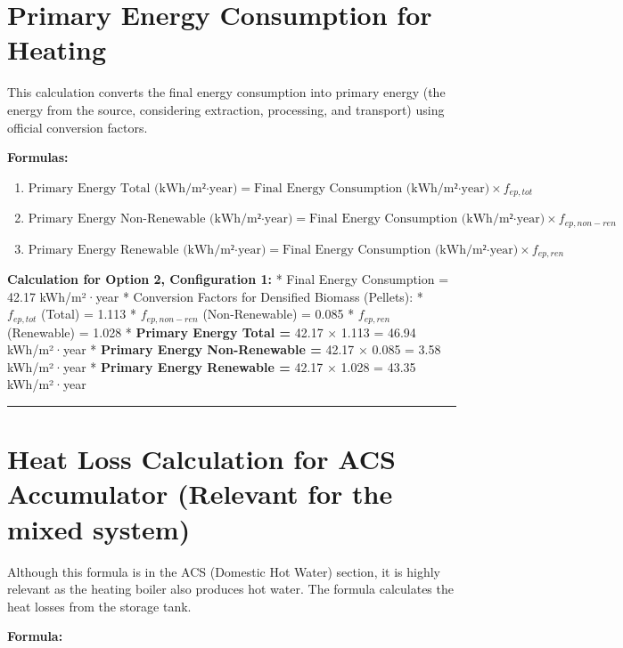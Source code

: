 \documentclass[
  10pt,
  letterpaper,
]{scrbook}
\providecommand{\tightlist}{%
  \setlength{\itemsep}{0pt}\setlength{\parskip}{0pt}}
\begin{document}
\section{Primary Energy Consumption for
Heating}\label{primary-energy-consumption-for-heating}

This calculation converts the final energy consumption into primary
energy (the energy from the source, considering extraction, processing,
and transport) using official conversion factors.

\textbf{Formulas:}

\begin{enumerate}
\def\labelenumi{\arabic{enumi}.}
\tightlist
\item
  \[\text{Primary Energy Total (kWh/m²·year)} = \text{Final Energy Consumption (kWh/m²·year)} \times f_{ep,tot}\]
\item
  \[\text{Primary Energy Non-Renewable (kWh/m²·year)} = \text{Final Energy Consumption (kWh/m²·year)} \times f_{ep,non-ren}\]
\item
  \[\text{Primary Energy Renewable (kWh/m²·year)} = \text{Final Energy Consumption (kWh/m²·year)} \times f_{ep,ren}\]
\end{enumerate}

\textbf{Calculation for Option 2, Configuration 1:} * Final Energy
Consumption = 42.17 kWh/m²·year * Conversion Factors for Densified
Biomass (Pellets): * \(f_{ep,tot}\) (Total) = 1.113 * \(f_{ep,non-ren}\)
(Non-Renewable) = 0.085 * \(f_{ep,ren}\) (Renewable) = 1.028 *
\textbf{Primary Energy Total =} 42.17 × 1.113 = 46.94 kWh/m²·year *
\textbf{Primary Energy Non-Renewable =} 42.17 × 0.085 = 3.58 kWh/m²·year
* \textbf{Primary Energy Renewable =} 42.17 × 1.028 = 43.35 kWh/m²·year

\begin{center}\rule{0.5\linewidth}{0.5pt}\end{center}

\section{Heat Loss Calculation for ACS Accumulator (Relevant for the
mixed
system)}\label{heat-loss-calculation-for-acs-accumulator-relevant-for-the-mixed-system}

Although this formula is in the ACS (Domestic Hot Water) section, it is
highly relevant as the heating boiler also produces hot water. The
formula calculates the heat losses from the storage tank.

\textbf{Formula:}
\end{document}
